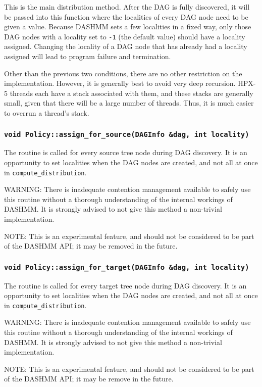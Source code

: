 This is the main distribution method. After the DAG is fully discovered, it will
be passed into this function where the localities of every DAG node need to be
given a value. Because DASHMM sets a few localities in a fixed way, only those
DAG nodes with a locality set to \texttt{-1} (the default value) should have
a locality assigned. Changing the locality of a DAG node that has already had
a locality assigned will lead to program failure and termination.

Other than the previous two conditions, there are no other restriction on the
implementation. However, it is generally best to avoid very deep recursion.
HPX-5 threads each have a stack associated with them, and these stacks are
generally small, given that there will be a large number of threads. Thus, it
is much easier to overrun a thread's stack.

\subsubsection{\texttt{void Policy::assign\_for\_source(DAGInfo \&dag, int locality)}}

The routine is called for every source tree node during DAG discovery. It is an
opportunity to set localities when the DAG nodes are created, and not all at
once in \texttt{compute\_distribution}.

WARNING: There is inadequate contention management available to safely use this
routine without a thorough understanding of the internal workings of DASHMM.
It is strongly advised to not give this method a non-trivial implementation.

NOTE: This is an experimental feature, and should not be considered to be part
of the DASHMM API; it may be removed in the future.

\subsubsection{\texttt{void Policy::assign\_for\_target(DAGInfo \&dag, int locality)}}

The routine is called for every target tree node during DAG discovery. It is an
opportunity to set localities when the DAG nodes are created, and not all at
once in \texttt{compute\_distribution}.

WARNING: There is inadequate contention management available to safely use this
routine without a thorough understanding of the internal workings of DASHMM.
It is strongly advised to not give this method a non-trivial implementation.

NOTE: This is an experimental feature, and should not be considered to be part
of the DASHMM API; it may be remove in the future.
